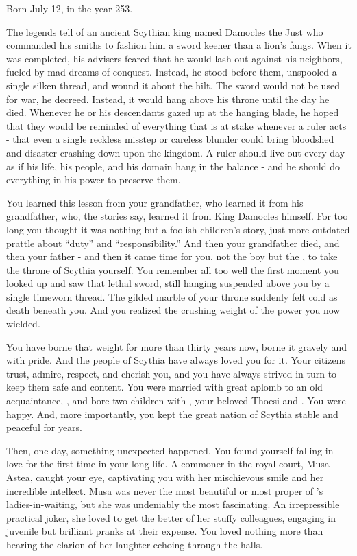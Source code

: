 \documentclass[char]{Kos}
\begin{document}
\name{\cScythiaKing{}}

Born July 12, in the year 253.

The legends tell of an ancient Scythian king named Damocles the Just who commanded his smiths to fashion him a sword keener than a lion's fangs. When it was completed, his advisers feared that he would lash out against his neighbors, fueled by mad dreams of conquest. Instead, he stood before them, unspooled a single silken thread, and wound it about the hilt. The sword would not be used for war, he decreed. Instead, it would hang above his throne until the day he died. Whenever he or his descendants gazed up at the hanging blade, he hoped that they would be reminded of everything that is at stake whenever a ruler acts - that even a single reckless misstep or careless blunder could bring bloodshed and disaster crashing down upon the kingdom. A ruler should live out every day as if his life, his people, and his domain hang in the balance - and he should do everything in his power to preserve them.

You learned this lesson from your grandfather, who learned it from his grandfather, who, the stories say, learned it from King Damocles himself. For too long you thought it was nothing but a foolish children's story, just more outdated prattle about ``duty'' and ``responsibility.'' And then your grandfather died, and then your father - and then it came time for you, not \cScythiaKing{} the boy but \cScythiaKing{} the \cScythiaKing{\Monarch}, to take the throne of Scythia yourself. You remember all too well the first moment you looked up and saw that lethal sword, still hanging suspended above you by a single timeworn thread. The gilded marble of your throne suddenly felt cold as death beneath you. And you realized the crushing weight of the power you now wielded.

You have borne that weight for more than thirty years now, borne it gravely and with pride. And the people of Scythia have always loved you for it. Your citizens trust, admire, respect, and cherish you, and you have always strived in turn to keep them safe and content. You were married with great aplomb to an old acquaintance, \cScythiaQueen{}, and bore two children with \cScythiaQueen{\them}, your beloved Thoesi and \cBride{}. You were happy. And, more importantly, you kept the great nation of Scythia stable and peaceful for years.

Then, one day, something unexpected happened. You found yourself falling in love for the first time in your long life. A commoner in the royal court, Musa Astea, caught your eye, captivating you with her mischievous smile and her incredible intellect. Musa was never the most beautiful or most proper of \cScythiaQueen{}'s ladies-in-waiting, but she was undeniably the most fascinating. An irrepressible practical joker, she loved to get the better of her stuffy colleagues, engaging in juvenile but brilliant pranks at their expense. You loved nothing more than hearing the clarion of her laughter echoing through the halls.
\end{document}

